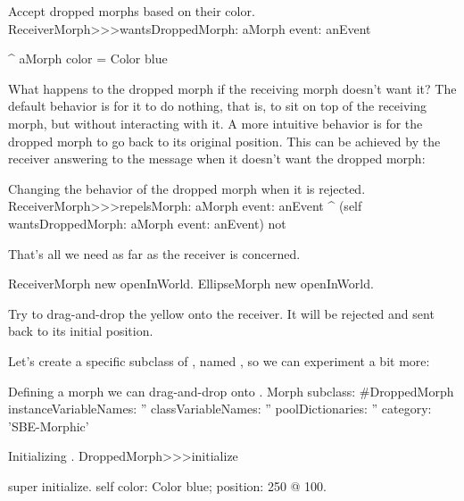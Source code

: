\documentclass[a4paper,10pt,twoside]{book}
\begin{document}
\begin{method}{Accept dropped morphs based on their color.}
ReceiverMorph>>>wantsDroppedMorph: aMorph event: anEvent

	^ aMorph color = Color blue
\end{method}

What happens to the dropped morph if the receiving morph doesn't want it?
The default behavior is for it to do nothing, that is, to sit on top of the receiving morph, but without interacting with it.
A more intuitive behavior is for the dropped morph to go back to its original position.
This can be achieved by the receiver answering  to the message  when it doesn't want the dropped morph:

\begin{method}{Changing the behavior of the dropped morph when it is rejected.}
ReceiverMorph>>>repelsMorph: aMorph event: anEvent
	^ (self wantsDroppedMorph: aMorph event: anEvent) not
\end{method}

That's all we need as far as the receiver is concerned.

\begin{code}{}
ReceiverMorph new openInWorld.
EllipseMorph new openInWorld.
\end{code}
\noindent
Try to drag-and-drop the yellow  onto the receiver.
It will be rejected and sent back to its initial position.


Let's create a specific subclass of , named , so we can experiment a bit more:

\begin{classdef}{Defining a morph we can drag-and-drop onto .}
Morph subclass: #DroppedMorph
	instanceVariableNames: ''
	classVariableNames: ''
	poolDictionaries: ''
	category: 'SBE-Morphic'
\end{classdef}

\begin{method}{Initializing .}
DroppedMorph>>>initialize

	super initialize.
	self 
		color: Color blue;
		position: 250 @ 100.
\end{method}
\end{document}

